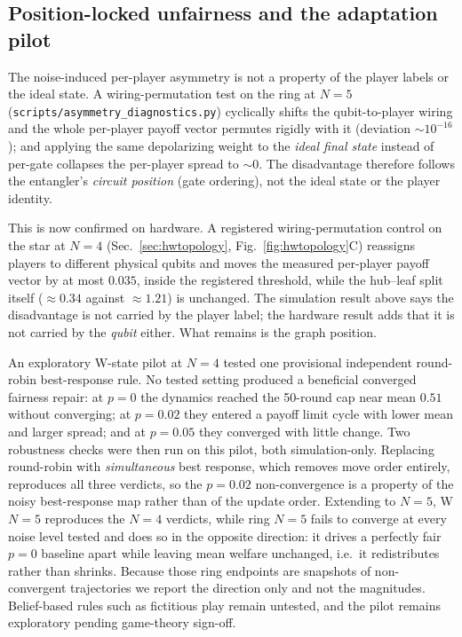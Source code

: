 \documentclass[conference]{IEEEtran}
\begin{document}
\subsection{Position-locked unfairness and the adaptation pilot}
The noise-induced per-player asymmetry is not a property of the player labels
or the ideal state. A wiring-permutation test on the ring at $N{=}5$
(\texttt{scripts/asymmetry\_diagnostics.py}) cyclically shifts the
qubit-to-player wiring and the whole per-player payoff vector permutes
rigidly with it (deviation $\sim10^{-16}$); and applying the same depolarizing
weight to the \emph{ideal final state} instead of per-gate collapses the
per-player spread to $\sim0$. The disadvantage therefore follows the
entangler's \emph{circuit position} (gate ordering), not the ideal state or
the player identity.

This is now confirmed on hardware. A registered wiring-permutation control on
the star at $N{=}4$ (Sec.~\ref{sec:hwtopology},
Fig.~\ref{fig:hwtopology}C) reassigns players to different physical qubits and
moves the measured per-player payoff vector by at most $0.035$, inside the
registered threshold, while the hub--leaf split itself
($\approx 0.34$ against $\approx 1.21$) is unchanged. The simulation result
above says the disadvantage is not carried by the player label; the hardware
result adds that it is not carried by the \emph{qubit} either. What remains is
the graph position.

An exploratory W-state pilot at $N{=}4$ tested one provisional independent
round-robin best-response rule. No tested setting produced a beneficial
converged fairness repair: at $p=0$ the dynamics reached the 50-round cap
near mean $0.51$ without converging; at $p=0.02$ they entered a payoff limit
cycle with lower mean and larger spread; and at $p=0.05$ they converged with
little change. Two robustness checks were then run on this pilot, both
simulation-only. Replacing round-robin with \emph{simultaneous} best response,
which removes move order entirely, reproduces all three verdicts, so the
$p=0.02$ non-convergence is a property of the noisy best-response map rather
than of the update order. Extending to $N{=}5$, W $N{=}5$ reproduces the
$N{=}4$ verdicts, while ring $N{=}5$ fails to converge at every noise level
tested and does so in the opposite direction: it drives a perfectly fair
$p{=}0$ baseline apart while leaving mean welfare unchanged, i.e.\ it
redistributes rather than shrinks. Because those ring endpoints are snapshots of
non-convergent trajectories we report the direction only and not the magnitudes.
Belief-based rules such as fictitious play remain untested, and the pilot
remains exploratory pending game-theory sign-off.
\end{document}
